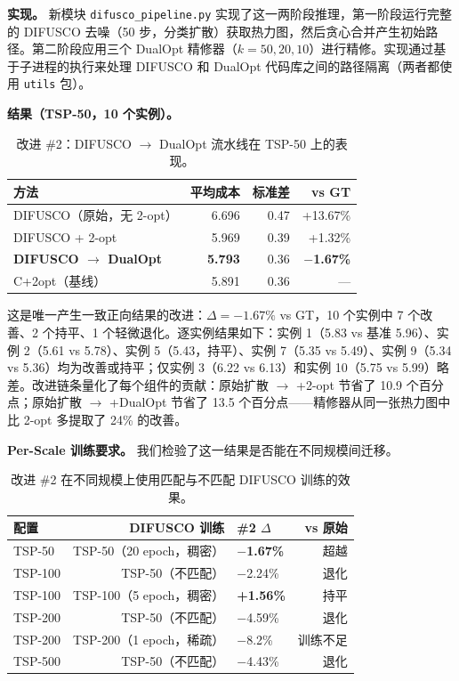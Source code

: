 \documentclass[11pt,a4paper]{ctexart}
\begin{document}
\textbf{实现。} 新模块 \texttt{difusco\_pipeline.py} 实现了这一两阶段推理，第一阶段运行完整的 DIFUSCO 去噪（50 步，分类扩散）获取热力图，然后贪心合并产生初始路径。第二阶段应用三个 DualOpt 精修器（$k=50,20,10$）进行精修。实现通过基于子进程的执行来处理 DIFUSCO 和 DualOpt 代码库之间的路径隔离（两者都使用 \texttt{utils} 包）。

\textbf{结果（TSP-50，10 个实例）。}

\begin{table}[H]
\centering
\small
\caption{改进 \#2：DIFUSCO $\rightarrow$ DualOpt 流水线在 TSP-50 上的表现。}
\begin{tabular}{@{}lrrr@{}}
\toprule
方法 & 平均成本 & 标准差 & vs GT \\
\midrule
DIFUSCO（原始，无 2-opt） & 6.696 & 0.47 & +13.67\% \\
DIFUSCO + 2-opt & 5.969 & 0.39 & +1.32\% \\
\textbf{DIFUSCO $\rightarrow$ DualOpt} & \textbf{5.793} & 0.36 & \textbf{$-$1.67\%} \\
C+2opt（基线） & 5.891 & 0.36 & --- \\
\bottomrule
\end{tabular}
\end{table}

这是唯一产生一致正向结果的改进：$\Delta = -1.67\%$ vs GT，10 个实例中 7 个改善、2 个持平、1 个轻微退化。逐实例结果如下：实例 1（5.83 vs 基准 5.96）、实例 2（5.61 vs 5.78）、实例 5（5.43，持平）、实例 7（5.35 vs 5.49）、实例 9（5.34 vs 5.36）均为改善或持平；仅实例 3（6.22 vs 6.13）和实例 10（5.75 vs 5.99）略差。改进链条量化了每个组件的贡献：原始扩散 $\rightarrow$ +2-opt 节省了 10.9 个百分点；原始扩散 $\rightarrow$ +DualOpt 节省了 13.5 个百分点——精修器从同一张热力图中比 2-opt 多提取了 24\% 的改善。

\textbf{Per-Scale 训练要求。} 我们检验了这一结果是否能在不同规模间迁移。

\begin{table}[H]
\centering
\small
\caption{改进 \#2 在不同规模上使用匹配与不匹配 DIFUSCO 训练的效果。}
\begin{tabular}{@{}lrlr@{}}
\toprule
配置 & DIFUSCO 训练 & \#2 $\Delta$ & vs 原始 \\
\midrule
TSP-50 & TSP-50（20 epoch，稠密） & \textbf{$-$1.67\%} & 超越 \\
TSP-100 & TSP-50（不匹配） & $-$2.24\% & 退化 \\
TSP-100 & TSP-100（5 epoch，稠密） & \textbf{+1.56\%} & 持平 \\
TSP-200 & TSP-50（不匹配） & $-$4.59\% & 退化 \\
TSP-200 & TSP-200（1 epoch，稀疏） & $-$8.2\% & 训练不足 \\
TSP-500 & TSP-50（不匹配） & $-$4.43\% & 退化 \\
\bottomrule
\end{tabular}
\end{table}
\end{document}
